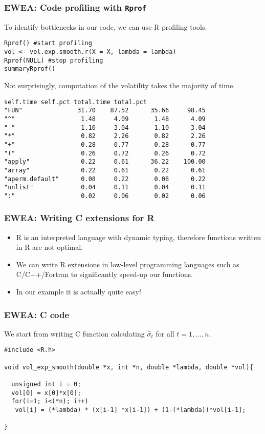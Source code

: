 \documentclass[handout]{beamer}
\begin{document}
\begin{frame}[fragile]
	\frametitle{EWEA: Code profiling with \texttt{Rprof}}
	To identify bottlenecks in our code, we can use R profiling tools.
\begin{Verbatim}[fontsize=\footnotesize]
Rprof() #start profiling
vol <- vol.exp.smooth.r(X = X, lambda = lambda)
Rprof(NULL) #stop profiling
summaryRprof()
\end{Verbatim}
Not surprisingly, computation of the volatility takes the majority of time.
\begin{Verbatim}[fontsize=\footnotesize]
                self.time self.pct total.time total.pct
"FUN"               31.70    87.52      35.66     98.45
"^"                  1.48     4.09       1.48      4.09
"-"                  1.10     3.04       1.10      3.04
"*"                  0.82     2.26       0.82      2.26
"+"                  0.28     0.77       0.28      0.77
"("                  0.26     0.72       0.26      0.72
"apply"              0.22     0.61      36.22    100.00
"array"              0.22     0.61       0.22      0.61
"aperm.default"      0.08     0.22       0.08      0.22
"unlist"             0.04     0.11       0.04      0.11
":"                  0.02     0.06       0.02      0.06

\end{Verbatim}

\end{frame}

\begin{frame}[fragile]
	\frametitle{EWEA: Writing C extensions for R}
	\begin{itemize}
		\item R is an interpreted language with dynamic typing, therefore functions written in R are not optimal. 
		\item We can write R extensions in low-level programming languages such as C/C++/Fortran to significantly speed-up our functions.
		\item In our example it is actually quite easy!
	\end{itemize}
\end{frame}

\begin{frame}[fragile]
	\frametitle{EWEA: C code}
We start from writing C function calculating $\hat{\sigma}_{t}$ for all $t=1,\ldots,n$.

\begin{Verbatim}[fontsize=\footnotesize]
#include <R.h>

void vol_exp_smooth(double *x, int *n, double *lambda, double *vol){
  
  unsigned int i = 0;
  vol[0] = x[0]*x[0]; 
  for(i=1; i<(*n); i++)
   vol[i] = (*lambda) * (x[i-1] *x[i-1]) + (1-(*lambda))*vol[i-1]; 
  
}
\end{Verbatim}

\end{frame}
\end{document}
